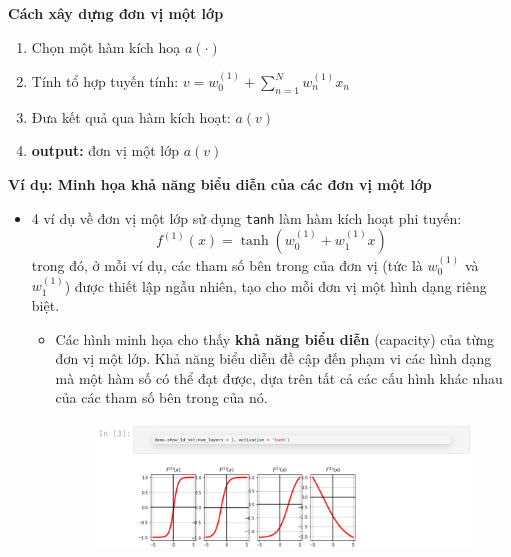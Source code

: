 \documentclass{book}
\begin{document}
    \textbf{Cách xây dựng đơn vị một lớp}
    \begin{enumerate}
        \item Chọn một hàm kích hoạ $a(\cdot)$
        \item Tính tổ hợp tuyến tính: $v = w^{(1)}_0 + \sum_{n=1}^{N} w^{(1)}_n x_n$
        \item Đưa kết quả qua hàm kích hoạt: $a(v)$
        \item \textbf{output:} đơn vị một lớp $a(v)$
    \end{enumerate}

    \textbf{Ví dụ: Minh họa khả năng biểu diễn của các đơn vị một lớp}
    \begin{itemize}
        \item 4 ví dụ về đơn vị một lớp sử dụng \texttt{tanh} làm hàm kích hoạt phi tuyến:
        \[
        f^{(1)}(x) = \tanh\left(w^{(1)}_0 + w^{(1)}_1 x\right)
        \]
        trong đó, ở mỗi ví dụ, các tham số bên trong của đơn vị (tức là $w^{(1)}_0$ và $w^{(1)}_1$) được thiết lập ngẫu nhiên, tạo cho mỗi đơn vị một hình dạng riêng biệt.
        \begin{itemize}
        \item Các hình minh họa cho thấy \textbf{khả năng biểu diễn} (capacity) của từng đơn vị một lớp. Khả năng biểu diễn  đề cập đến phạm vi các hình dạng mà một hàm số có thể đạt được, dựa trên tất cả các cấu hình khác nhau của các tham số bên trong của nó.
        \begin{figure}[H]
            \centering
            \includegraphics[width=1.0\linewidth]{images/code18.png}
            \label{fig:code18}
        \end{figure}
    \end{itemize}
    \end{itemize}
\end{document}
